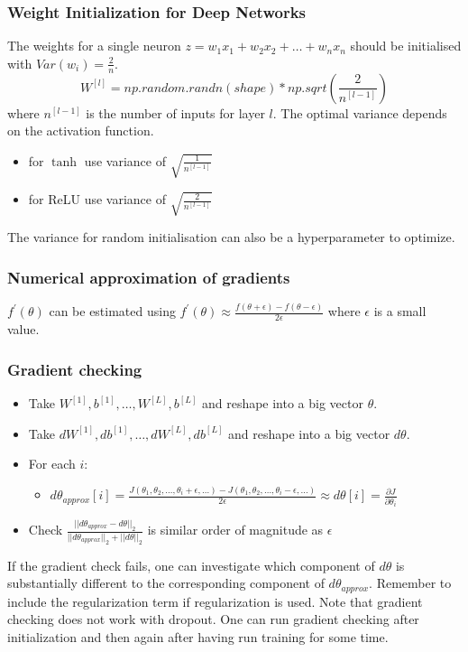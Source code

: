 \documentclass{article}
\begin{document}
\subsubsection{Weight Initialization for Deep Networks}
The weights for a single neuron $z=w_1x_1+w_2x_2+\ldots+w_nx_n$ should be initialised with $Var(w_i)=\frac{2}{n}$.
\begin{equation}
  W^{[l]}=np.random.randn(shape)*np.sqrt(\frac{2}{n^{[l-1]}})
\end{equation}
where $n^{[l-1]}$ is the number of inputs for layer $l$.
The optimal variance depends on the activation function.
\begin{itemize}
  \item for $\tanh$ use variance of $\sqrt{\frac{1}{n^{[l-1]}}}$
  \item for ReLU use variance of $\sqrt{\frac{2}{n^{[l-1]}}}$
\end{itemize}
The variance for random initialisation can also be a hyperparameter to optimize.

\subsubsection{Numerical approximation of gradients}
$f^\prime(\theta)$ can be estimated using
$f^\prime(\theta)\approx\frac{f(\theta+\epsilon)-f(\theta-\epsilon)}{2\epsilon}$ where $\epsilon$ is a small value.

\subsubsection{Gradient checking}
\begin{itemize}
  \item Take $W^{[1]},b^{[1]},\ldots,W^{[L]},b^{[L]}$ and reshape into a big vector $\theta$.
  \item Take $dW^{[1]},db^{[1]},\ldots,dW^{[L]},db^{[L]}$ and reshape into a big vector $d\theta$.
  \item For each $i$:
    \begin{itemize}
      \item $d\theta_{approx}[i]=
        \frac{J(\theta_1,\theta_2,\ldots,\theta_i+\epsilon,\ldots)- J(\theta_1,\theta_2,\ldots,\theta_i-\epsilon,\ldots)}{2\epsilon}
        \approx d\theta[i]=\frac{\partial J}{\partial\theta_i}$
    \end{itemize}
  \item Check $\frac{||d\theta_{approx}-d\theta||_2}{||d\theta_{approx}||_2+||d\theta||_2}$ is similar order of magnitude as  $\epsilon$
\end{itemize}
If the gradient check fails, one can investigate which component of $d\theta$ is substantially different to
the corresponding component of $d\theta_{approx}$.
Remember to include the regularization term if regularization is used.
Note that gradient checking does not work with dropout.
One can run gradient checking after initialization and then again after having run training for some time.
\end{document}
